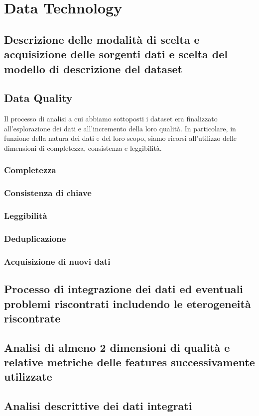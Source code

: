 \setcounter{chapter}{0}

\part{Data Technology}

\chapter{Descrizione delle modalità di scelta e acquisizione delle sorgenti dati e scelta del modello di descrizione del dataset}

\chapter{Data Quality}


Il processo di analisi a cui abbiamo sottoposti i dataset era finalizzato all'esplorazione dei dati e all'incremento della loro qualità. In particolare, in funzione della natura dei dati e del loro scopo, siamo ricorsi all'utilizzo delle dimensioni di completezza, consistenza e leggibilità.


\section{Completezza}

\section{Consistenza di chiave}

\section{Leggibilità}

\section{Deduplicazione}


\section{Acquisizione di nuovi dati}

\chapter{Processo di integrazione dei dati ed eventuali problemi riscontrati includendo le eterogeneità riscontrate}



\chapter{Analisi di almeno 2 dimensioni di qualità e relative metriche delle features successivamente utilizzate}
\chapter{Analisi descrittive dei dati integrati}

